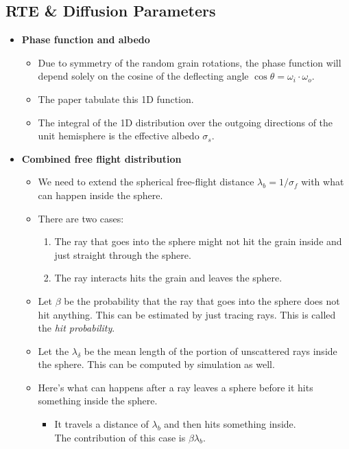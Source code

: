 \documentclass[10pt]{article}
\begin{document}
  \subsection{RTE \& Diffusion Parameters}

  \begin{itemize}
  	\item {\bf Phase function and albedo}
  	\begin{itemize}
  		\item Due to symmetry of the random grain rotations, the phase function will depend solely on the cosine of the deflecting angle $\cos \theta = \omega_i \cdot \omega_o$.

  		\item The paper tabulate this 1D function. 

  		\item The integral of the 1D distribution over the outgoing directions of the unit hemisphere is the effective albedo $\sigma_s$.
  	\end{itemize}
  	

  	\item {\bf Combined free flight distribution}
  	\begin{itemize}
  		\item We need to extend the spherical free-flight distance $\lambda_b = 1 / \sigma_f$ with what can happen inside the sphere.

  		\item There are two cases:
  		\begin{enumerate}
  			\item The ray that goes into the sphere might not hit the grain inside and just straight through the sphere.
  			\item The ray interacts hits the grain and leaves the sphere.  			
  		\end{enumerate}

  		\item Let $\beta$ be the probability that the ray that goes into the sphere does not hit anything.  This can be estimated by just tracing rays.  This is called the \emph{hit probability}.

  		\item Let the $\lambda_\delta$ be the mean length of the portion of unscattered rays inside the sphere.  This can be computed by simulation as well.

  		\item Here's what can happens after a ray leaves a sphere before it hits something inside the sphere.
  		\begin{itemize}
  			\item It travels a distance of $\lambda_b$ and then hits something inside.\\
  			The contribution of this case is $\beta \lambda_b$.


\end{itemize}
\end{itemize}
\end{itemize}
\end{document}
